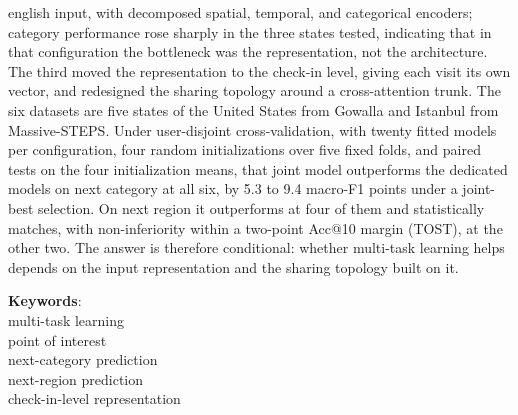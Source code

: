 \begin{resumo}[Abstract]
\begin{otherlanguage*}{english}
            input, with decomposed spatial, temporal, and categorical encoders; category
            performance rose sharply in the three states tested, indicating that in that
            configuration the bottleneck was the representation, not the architecture. The
            third moved the representation to the
            check-in level, giving each visit its own vector, and redesigned the sharing topology
            around a cross-attention trunk. The six datasets are five states of the United States
            from Gowalla and Istanbul from Massive-STEPS. Under user-disjoint cross-validation,
            with twenty fitted models per configuration, four random initializations over five
            fixed folds, and paired tests on the four initialization means, that joint model outperforms
            the dedicated models on next category at all six, by 5.3 to 9.4 macro-F1 points under
            a joint-best selection. On next region it outperforms at four of them and
            statistically matches, with non-inferiority within a two-point Acc@10 margin (TOST),
            at the other two. The answer is therefore conditional: whether multi-task learning
            helps depends on the input representation and the sharing topology built on it.

            \vspace{\onelineskip}
            \noindent
            \begin{minipage}{\linewidth}
                \textbf{Keywords}:\\
                multi-task learning\\
                point of interest\\
                next-category prediction\\
                next-region prediction\\
                check-in-level representation
            \end{minipage}
        \end{otherlanguage*}
    \end{resumo}
    \else
    \pagestyle{empty}
    \fi

